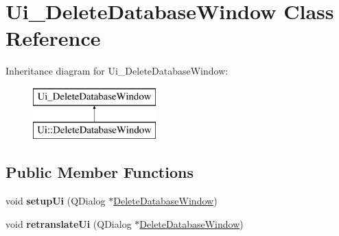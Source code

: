 \hypertarget{class_ui___delete_database_window}{}\section{Ui\+\_\+\+Delete\+Database\+Window Class Reference}
\label{class_ui___delete_database_window}
Inheritance diagram for Ui\+\_\+\+Delete\+Database\+Window\+:\begin{figure}[H]
\begin{center}
\leavevmode
\includegraphics[height=2.000000cm]{class_ui___delete_database_window}
\end{center}
\end{figure}
\subsection*{Public Member Functions}
\begin{DoxyCompactItemize}
\item 
\mbox{\label{class_ui___delete_database_window_a74620a9727fa723b177d0b1f3b336c05}} 
void {\bfseries setup\+Ui} (Q\+Dialog $\ast$\mbox{\hyperlink{class_delete_database_window}{Delete\+Database\+Window}})
\item 
\mbox{\label{class_ui___delete_database_window_a3435372b2253f0e77b0c47a468591d2e}} 
void {\bfseries retranslate\+Ui} (Q\+Dialog $\ast$\mbox{\hyperlink{class_delete_database_window}{Delete\+Database\+Window}})
\end{DoxyCompactItemize}
